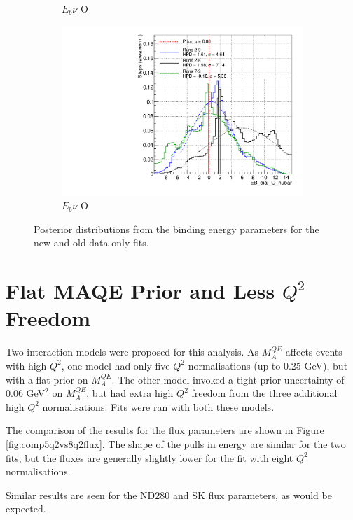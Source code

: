 \begin{figure}
\begin{subfigure}{.48\textwidth}
  \caption{$E_{b}\nu$ O}
\end{subfigure}
\begin{subfigure}{.48\textwidth}
  \centering
  \includegraphics[width=0.73\linewidth]{figs/Runs_EB_dial_O_nubar}
  \caption{$E_{b}\bar{\nu}$ O}
\end{subfigure}
\caption{Posterior distributions from the binding energy parameters for the new and old data only fits.}
\label{fig:RunsEbdata}
\end{figure}

\section{Flat MAQE Prior and Less $Q^2$ Freedom}

Two interaction models were proposed for this analysis. As $M_{A}^{QE}$ affects events with high $Q^{2}$, one model had only five $Q^2$ normalisations (up to 0.25 GeV), but with a flat prior on $M_{A}^{QE}$. The other model invoked a tight prior uncertainty of 0.06 GeV$^2$ on $M_{A}^{QE}$, but had extra high $Q^2$ freedom from the three additional high $Q^2$ normalisations. Fits were ran with both these models.

The comparison of the results for the flux parameters are shown in Figure \ref{fig:comp5q2vs8q2flux}. The shape of the pulls in energy are similar for the two fits, but the fluxes are generally slightly lower for the fit with eight $Q^2$ normalisations.

Similar results are seen for the ND280 and SK flux parameters, as would be expected.

